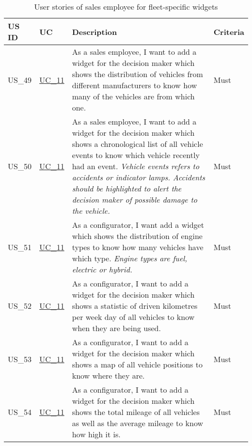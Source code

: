   \label{FlottenWidgets}
  \sffamily
  \begin{footnotesize}
    \begin{longtable}[L L L L ]{ p{} p{} p{} p{}}
      \caption                       %
          {User stories of sales employee for fleet-specific widgets} %
          \\
      \toprule
      \textbf{US ID} & \textbf{UC} & \textbf{Description} & \textbf{Criteria} \\
      \midrule
      \hypertarget{Ref:US49}{US\_49} & \hyperlink{Ref:UC11}{UC\_11} & As a sales employee, I want to add a widget for the decision maker which shows the distribution of vehicles from different manufacturers to know how many of the vehicles are from which one. & Must  \\
      \hypertarget{Ref:US50}{US\_50} & \hyperlink{Ref:UC11}{UC\_11} & As a sales employee, I want to add a widget for the decision maker which shows a chronological list of all vehicle events to know which vehicle recently had an event.
      \newline
      \emph{Vehicle events refers to accidents or indicator lamps. Accidents should be highlighted to alert the decision maker of possible damage to the vehicle.} & Must \\
      \hypertarget{Ref:US51}{US\_51} & \hyperlink{Ref:UC11}{UC\_11} & As a configurator, I want add a widget which shows the distribution of engine types to know how many vehicles have which type. 
      \newline
      \emph{Engine types are fuel, electric or hybrid.} & Must \\
      \hypertarget{Ref:US52}{US\_52} & \hyperlink{Ref:UC11}{UC\_11} & As a configurator, I want to add a widget for the decision maker which shows a statistic of driven kilometres per week day of all vehicles to know when they are being used. & Must \\
      \hypertarget{Ref:US53}{US\_53} & \hyperlink{Ref:UC11}{UC\_11} & As a configurator, I want to add a widget for the decision maker which shows a map of all vehicle positions to know where they are. & Must \\
      \hypertarget{Ref:US54}{US\_54} & \hyperlink{Ref:UC11}{UC\_11} & As a configurator, I want to add a widget for the decision maker which shows the total mileage of all vehicles as well as the average mileage to know how high it is. & Must \\
      \bottomrule
    \end{longtable}
  \end{footnotesize}
  \rmfamily

